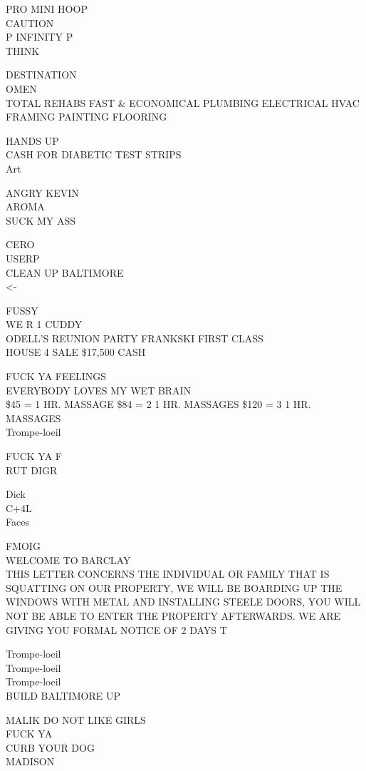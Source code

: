 \documentclass[10pt,letterpaper]{article}
\begin{document}
PRO MINI HOOP\\
CAUTION\\
P INFINITY P\\
THINK

DESTINATION\\
OMEN\\
TOTAL REHABS FAST \& ECONOMICAL PLUMBING ELECTRICAL HVAC FRAMING PAINTING FLOORING

HANDS UP\\
CASH FOR DIABETIC TEST STRIPS\\
Art

ANGRY KEVIN\\
AROMA\\
SUCK MY ASS

CERO\\
USERP\\
CLEAN UP BALTIMORE\\
<{-}

FUSSY\\
WE R 1 CUDDY\\
ODELL'S REUNION PARTY FRANKSKI FIRST CLASS\\
HOUSE 4 SALE \$17,500 CASH

FUCK YA FEELINGS\\
EVERYBODY LOVES MY WET BRAIN\\
\$45 = 1 HR. MASSAGE \$84 = 2 1 HR. MASSAGES  \$120 = 3 1 HR. MASSAGES\\
Trompe{-}loeil

FUCK YA F\\
RUT DIGR

Dick\\
C+4L\\
Faces

FMOIG\\
WELCOME TO BARCLAY\\
THIS LETTER CONCERNS THE INDIVIDUAL OR FAMILY THAT IS SQUATTING ON OUR PROPERTY, WE WILL BE BOARDING UP THE WINDOWS WITH METAL AND INSTALLING STEELE DOORS, YOU WILL NOT BE ABLE TO ENTER THE PROPERTY AFTERWARDS.  WE ARE GIVING YOU FORMAL NOTICE OF 2 DAYS T

Trompe{-}loeil\\
Trompe{-}loeil\\
Trompe{-}loeil\\
BUILD BALTIMORE UP

MALIK DO NOT LIKE GIRLS\\
FUCK YA\\
CURB YOUR DOG\\
MADISON
\end{document}
